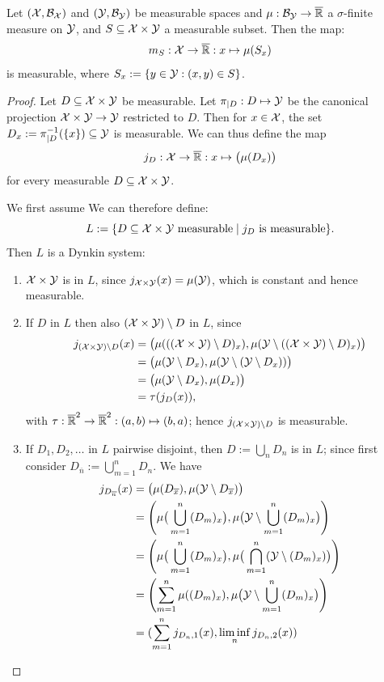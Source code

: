 \begin{Lem}
Let $(\mathcal{X},\mathcal{B}_{\mathcal{X}})$ and $(\mathcal{Y},\mathcal{B}_{\mathcal{Y}})$ be measurable spaces and $\mu : \mathcal{B}_{\mathcal{Y}} \to \overline{\mathbb{R}}$ a $\sigma$-finite measure on $\mathcal{Y}$, and $S \subseteq \mathcal{X} \times \mathcal{Y}$ a measurable subset.
Then the map: 
  $$m_S: \mathcal{X} \to \overline{\mathbb{R}} : x \mapsto \mu(S_x)$$
is measurable, where $S_x := \{ y \in \mathcal{Y} : (x,y) \in S\}$.
\end{Lem}
\begin{proof}
Let $D \subseteq \mathcal{X} \times \mathcal{Y}$ be measurable.
Let $\pi_{|D} : D \mapsto \mathcal{Y}$ be the canonical projection $\mathcal{X} \times \mathcal{Y} \to \mathcal{Y}$ restricted to $D$.
Then for $x \in \mathcal{X}$, the set $D_x := \pi_{|D}^{-1}(\{x\}) \subseteq \mathcal{Y}$ is measurable.
We can thus define the map 
  $$j_D : \mathcal{X} \to \overline{\mathbb{R}} : x \mapsto \big(\mu(D_x)\big)$$
for every measurable $D \subseteq \mathcal{X} \times \mathcal{Y}$.

We first assume 
We can therefore define:
  $$L := \{ D \subseteq \mathcal{X} \times \mathcal{Y} \text{ measurable} \mid j_D \text{ is measurable} \}.$$
Then $L$ is a Dynkin system:
\begin{enumerate}
  \item $\mathcal{X} \times \mathcal{Y}$ is in $L$, since $j_{\mathcal{X}\times \mathcal{Y}}(x) = \mu(\mathcal{Y})$, which is constant and hence measurable.
  \item If $D$ in $L$ then also $(\mathcal{X} \times \mathcal{Y}) \setminus D$ in $L$, since
    \begin{equation*}\begin{split}
      j_{(\mathcal{X} \times \mathcal{Y}) \setminus D}(x) 
      &= \big(\mu(((\mathcal{X} \times \mathcal{Y}) \setminus D)_x),\mu(\mathcal{Y} \setminus ((\mathcal{X} \times \mathcal{Y}) \setminus D)_x)\big) \\
      &= \big(\mu(\mathcal{Y} \setminus D_x),\mu(\mathcal{Y} \setminus (\mathcal{Y} \setminus D_x))\big) \\
      &= \big(\mu(\mathcal{Y} \setminus D_x),\mu(D_x)\big) \\
      &= \tau(j_D(x)),
    \end{split}\end{equation*}
    with $\tau : \overline{\mathbb{R}}^2 \to \overline{\mathbb{R}}^2 : (a,b) \mapsto (b,a)$;
    hence $j_{(\mathcal{X} \times \mathcal{Y}) \setminus D}$ is measurable.
  \item If $D_1,D_2,\ldots$ in $L$ pairwise disjoint, then $D := \bigcup_n D_n$ is in $L$; since
    first consider $D_{\overline{n}} := \bigcup_{m=1}^n D_n$. We have
    \begin{equation*}\begin{split}
      j_{D_{\overline{n}}}(x) 
      &= \big(\mu(D_{\overline{x}}),\mu(\mathcal{Y} \setminus D_{\overline{x}})\big) \\
      &= \left(\mu\big(\bigcup_{m=1}^n (D_m)_x\big),\mu\big(\mathcal{Y} \setminus \bigcup_{m=1}^n (D_m)_x\big)\right) \\
      &= \left(\mu\big(\bigcup_{m=1}^n (D_m)_x\big),\mu\big(\bigcap_{m=1}^n (\mathcal{Y} \setminus (D_m)_x)\big)\right) \\
      &= \left(\sum_{m=1}^n \mu((D_m)_x), \mu\big(\mathcal{Y} \setminus \bigcup_{m=1}^n (D_m)_x\big)\right) \\
      &= (\sum_{m=1}^n j_{D_n,1}(x), \liminf_n j_{D_n,2}(x))
    \end{split}\end{equation*}


\end{enumerate}
\end{proof}
